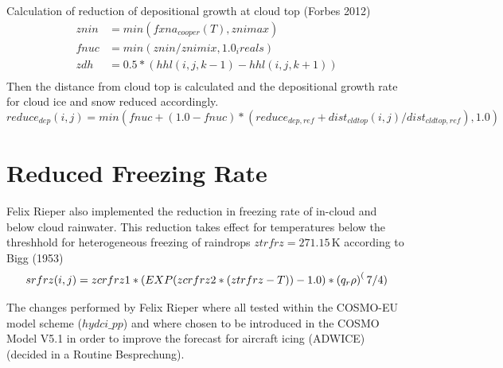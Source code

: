 \documentclass[a4paper,11pt]{article}
\renewcommand{\l}{\ensuremath{\left}}
\renewcommand{\r}{\ensuremath{\right}}
\begin{document}
Calculation of reduction of depositional growth at cloud top (Forbes 2012)
\begin{align}
  znin & = min( fxna_{cooper}(T), znimax )\\
  fnuc & = min(znin/znimix, 1.0_ireals)\\
  zdh  & = 0.5 * (hhl(i,j,k-1)-hhl(i,j,k+1))\\
\end{align}
Then the distance from cloud top is calculated and the depositional growth
rate for cloud ice and snow reduced accordingly. 
\begin{equation}
  reduce_{dep}(i,j) = min(fnuc + (1.0 -fnuc)*(reduce_{dep,ref} + dist_{cldtop}(i,j)/dist_{cldtop,ref}), 1.0)
\end{equation}

\section{Reduced Freezing Rate}
Felix Rieper also implemented the reduction in freezing rate of in-cloud and
below cloud rainwater. This reduction takes effect for temperatures below the
threshhold for heterogeneous freezing of raindrops $ztrfrz=271.15 \,\text{K}$
according to Bigg (1953)
\begin{align}
  srfrz(i,j) = zcrfrz1*(EXP(zcrfrz2*(ztrfrz-T))-1.0) * \l(q_r \rho\r)^(7/4)
\end{align}

The changes performed by Felix Rieper where all tested within the COSMO-EU model scheme
($hydci\_pp$) and where chosen to be introduced in the COSMO Model V5.1 in order
to improve the forecast for aircraft icing (ADWICE) (decided in a Routine
Besprechung).



\end{document}
